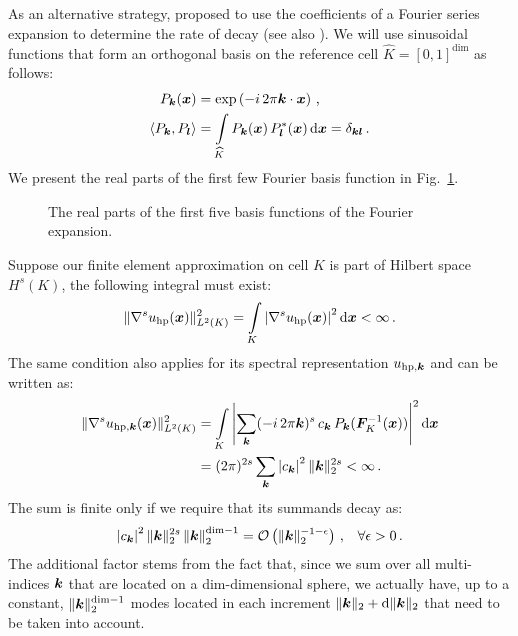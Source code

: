 As an alternative strategy, \textcite{bangerth2009} proposed to use the coefficients of a Fourier series expansion to determine the rate of decay (see also \textcite{dealiistep-27}). We will use sinusoidal functions that form an orthogonal basis on the reference cell $\widehat{K} = [0,1]^\text{dim}$ as follows:
\begin{align}
P_\tuple{k}(\vec{x}) &= \exp\left(- i \, 2\pi \tuple{k} \cdot \vec{x}\right) \,\text{,} \\
\langle P_\tuple{k}, P_\tuple{l} \rangle &= \int\limits_{\widehat{K}} P_\tuple{k}(\vec{x}) \, P_\tuple{l}^\ast(\vec{x}) \differential{\vec{x}} = \delta_{\tuple{k} \tuple{l}} \,\text{.}
\end{align}
We present the real parts of the first few Fourier basis function in Fig.~\ref{fig:fourier}.

\begin{figure}
\centering

\caption{The real parts of the first five basis functions of the Fourier expansion.}
\label{fig:fourier}
\end{figure}

Suppose our finite element approximation on cell $K$ is part of Hilbert space $H^s(K)$, the following integral must exist:
\begin{align}
\| \nabla^s u_{\text{hp}}(\vec{x}) \|_{L^2(K)}^2 = \int\limits_K \left| \nabla^s u_{\text{hp}}(\vec{x}) \right|^2 \differential{\vec{x}} < \infty \,\text{.}
\end{align}
The same condition also applies for its spectral representation $u_{\text{hp},\tuple{k}}$ and can be written as:
\begin{align}
\| \nabla^s u_{\text{hp}, \tuple{k}}(\vec{x}) \|_{L^2(K)}^2 &= \int\limits_K \left| \sum\limits_{\tuple{k}} (-i \, 2 \pi \tuple{k})^s \, c_\tuple{k} \, P_\tuple{k}(\mat{F}_K^{-1}(\vec{x})) \right|^2 \differential{\vec{x}} \\
&= (2 \pi)^{2s} \sum\limits_{\tuple{k}} \left| c_\tuple{k} \right|^2 \|\tuple{k}\|_2^{2s} < \infty \,\text{.}
\end{align}
The sum is finite only if we require that its summands decay as:
\begin{align}
\left| c_\tuple{k} \right|^2 \|\tuple{k}\|_2^{2s} \left\| \tuple{k} \right\|_2^{\text{dim} - 1} = \mathcal{O}\left( \|\tuple{k}\|_2^{-1-\epsilon} \right) \,\text{,} \quad \forall \epsilon > 0 \,\text{.}
\end{align}
The additional factor stems from the fact that, since we sum over all multi-indices $\tuple{k}$ that are located on a dim-dimensional sphere, we actually have, up to a constant, $\|\tuple{k}\|_2^{\text{dim}-1}$ modes located in each increment $\|\tuple{k}\|_2 + \differential{\|\tuple{k}\|_2}$ that need to be taken into account. \textcite{dealiistep-27}

